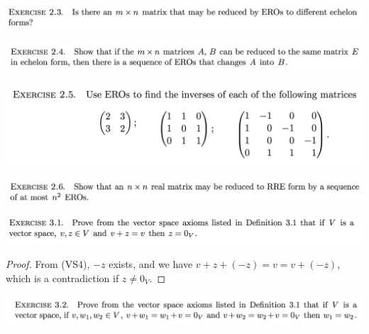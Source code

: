 \documentclass[12pt]{article}
\begin{document}
\begin{mdframed}
\includegraphics[width=400pt]{img/oxford-prelims-M1-linear-algebra-2-3.png}
\end{mdframed}

\begin{mdframed}
\includegraphics[width=400pt]{img/oxford-prelims-M1-linear-algebra-2-4.png}
\end{mdframed}

\begin{mdframed}
\includegraphics[width=400pt]{img/oxford-prelims-M1-linear-algebra-2-5.png}
\end{mdframed}

\begin{mdframed}
\includegraphics[width=400pt]{img/oxford-prelims-M1-linear-algebra-2-6.png}
\end{mdframed}


\newpage
\begin{mdframed}
  \includegraphics[width=400pt]{img/oxford-prelims-M1-linear-algebra-3-1.png}
\end{mdframed}

\begin{proof}
  From (VS4), $-z$ exists, and we have $v + z + (-z) = v = v + (-z)$, which is a
  contradiction if $z \neq 0_V$.
\end{proof}

\begin{mdframed}
  \includegraphics[width=400pt]{img/oxford-prelims-M1-linear-algebra-3-2.png}
\end{mdframed}
\end{document}
